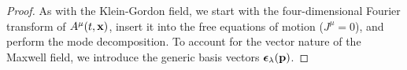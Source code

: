 \mwcoulombmodeexpansion
\begin{proof}
	As with the Klein-Gordon field, we start with the four-dimensional Fourier transform of $A^\mu(t,\vb{x})$, insert it into the free equations of motion ($J^\mu=0$), and perform the mode decomposition.
	To account for the vector nature of the Maxwell field, we introduce the generic basis vectors $\boldsymbol{\epsilon}_\lambda(\vb{p})$.
\end{proof}